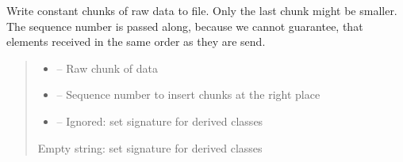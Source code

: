 \documentclass[letterpaper,10pt,english]{sphinxmanual}
\begin{document}
\begin{savenotes}
\begin{fulllineitems}
\begin{savenotes}\begin{fulllineitems}
\label{\detokenize{eezz:eezz.filesrv.TFile.write}}
\pysigstartsignatures
{}
\pysigstopsignatures
\sphinxAtStartPar
Write constant chunks of raw data to file. Only the last chunk might be smaller.
The sequence number is passed along, because we cannot guarantee, that elements received in the same
order as they are send.
\begin{quote}\begin{description}
\begin{itemize}
\item {} 
\sphinxAtStartPar
{} – Raw chunk of data

\item {} 
\sphinxAtStartPar
{} – Sequence number to insert chunks at the right place

\item {} 
\sphinxAtStartPar
{} – Ignored:   set signature for derived classes

\end{itemize}

\sphinxAtStartPar
Empty string:  set signature for derived classes

\end{description}\end{quote}

\end{fulllineitems}\end{savenotes}


\end{fulllineitems}\end{savenotes}
\end{document}
